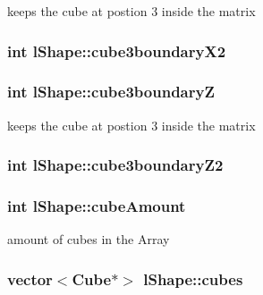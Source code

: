 keeps the cube at postion 3 inside the matrix \hypertarget{classl_shape_a0f7a444fa8cd6e97446cbabab54e2694}{
\subsubsection[{cube3boundary\-X2}]{\setlength{\rightskip}{0pt plus 5cm}int l\-Shape\-::cube3boundary\-X2}}\label{classl_shape_a0f7a444fa8cd6e97446cbabab54e2694}
\hypertarget{classl_shape_a3c7d3b8972b9c3f1412b68fd5aa1578c}{
\subsubsection[{cube3boundary\-Z}]{\setlength{\rightskip}{0pt plus 5cm}int l\-Shape\-::cube3boundary\-Z}}\label{classl_shape_a3c7d3b8972b9c3f1412b68fd5aa1578c}
keeps the cube at postion 3 inside the matrix \hypertarget{classl_shape_ad8c92abfc345e4db74163fc6ddccfbab}{
\subsubsection[{cube3boundary\-Z2}]{\setlength{\rightskip}{0pt plus 5cm}int l\-Shape\-::cube3boundary\-Z2}}\label{classl_shape_ad8c92abfc345e4db74163fc6ddccfbab}
\hypertarget{classl_shape_abae09efbbd20c715443d301ac1f6ba11}{
\subsubsection[{cube\-Amount}]{\setlength{\rightskip}{0pt plus 5cm}int l\-Shape\-::cube\-Amount}}\label{classl_shape_abae09efbbd20c715443d301ac1f6ba11}
amount of cubes in the Array \hypertarget{classl_shape_a8606e1412da87e60c1fcf23205afb924}{
\subsubsection[{cubes}]{\setlength{\rightskip}{0pt plus 5cm}vector$<${\bf Cube}$\ast$$>$ l\-Shape\-::cubes}}\label{classl_shape_a8606e1412da87e60c1fcf23205afb924}

